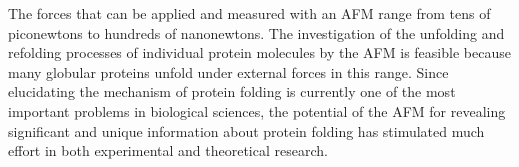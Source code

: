 The forces that can be applied and measured with an AFM range from
tens of piconewtons to hundreds of nanonewtons.  The investigation of
the unfolding and refolding processes of individual protein molecules
by the AFM is feasible because many globular proteins unfold under
external forces in this range.  Since elucidating the mechanism of
protein folding is currently one of the most important problems in
biological sciences, the potential of the AFM for revealing
significant and unique information about protein folding has
stimulated much effort in both experimental and theoretical research.
